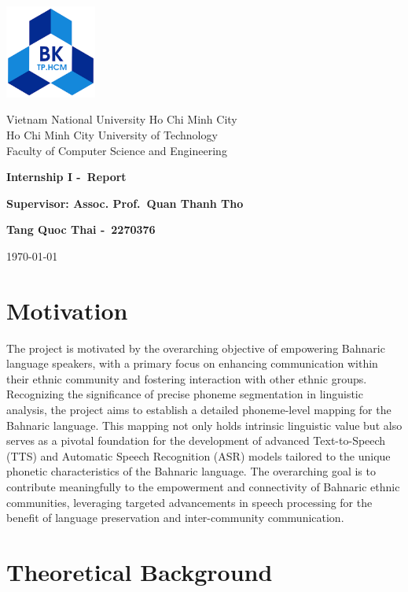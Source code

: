 \documentclass{article}
\author{}
\newcommand{\schoolname}{Vietnam National University Ho Chi Minh City \\ Ho Chi Minh City University of Technology \\ Faculty of Computer Science and Engineering}
\newcommand{\schoollogo}{\includegraphics[width=3cm]{img/hcmut.png}}
\begin{document}
\begin{titlepage}
    \centering
    \vspace*{2cm}
    \schoollogo\par
    \vspace{1cm}
    {\Large \schoolname\par}
    \vspace{3cm}
    {\huge\bfseries Internship I -\ Report \par}
    \vspace{1cm}
    {\Large\bfseries Supervisor: Assoc. Prof.\ Quan Thanh Tho \par}
    \vspace{1cm}
    {\large \bfseries Tang Quoc Thai -\ 2270376\par}
    \vfill
    {\large \today\par}
\end{titlepage}

\section{Motivation}
The project is motivated by the overarching objective of empowering Bahnaric language speakers, with a primary focus on enhancing communication within their ethnic community and fostering interaction with other ethnic groups. Recognizing the significance of precise phoneme segmentation in linguistic analysis, the project aims to establish a detailed phoneme-level mapping for the Bahnaric language. This mapping not only holds intrinsic linguistic value but also serves as a pivotal foundation for the development of advanced Text-to-Speech (TTS) and Automatic Speech Recognition (ASR) models tailored to the unique phonetic characteristics of the Bahnaric language. The overarching goal is to contribute meaningfully to the empowerment and connectivity of Bahnaric ethnic communities, leveraging targeted advancements in speech processing for the benefit of language preservation and inter-community communication.
\section{Theoretical Background}
\end{document}

